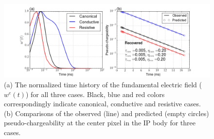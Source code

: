 \documentclass[a4paper, 11pt]{article}
\newcommand{\peta}{\tilde{\eta}}
\newcommand{\dip}{\dip}
\begin{document}
\begin{figure}[htb]
  \centering  \includegraphics[width=1.0\textwidth]{figures/threecasesresp/wepetathree.png}
  \caption{(a) The normalized time history of the fundamental electric field ($w^e(t)$) for all three cases. Black, blue and red colors correspondingly indicate canonical, conductive and resistive cases. (b) Comparisons of the observed (line) and predicted (empty circles) pseudo-chargeability at the center pixel in the IP body for three cases.}
  \label{F:wepetathree}
\end{figure}


\end{document}
